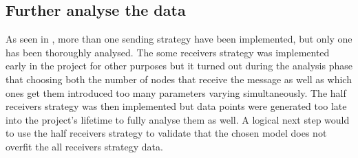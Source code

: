 \subsection{Further analyse the data}
As seen in , more than one sending strategy have been
implemented, but only one has been thoroughly analysed. The some receivers
strategy was implemented early in the project for other purposes but it turned
out during the analysis phase that choosing both the number of nodes that receive
the message as well as which ones get them introduced too many parameters
varying simultaneously. The half receivers strategy was then implemented but data points
were generated too late into the project's lifetime to fully analyse them as
well. A logical next step would to use the half receivers strategy to validate
that the chosen model does not overfit the all receivers strategy data.
